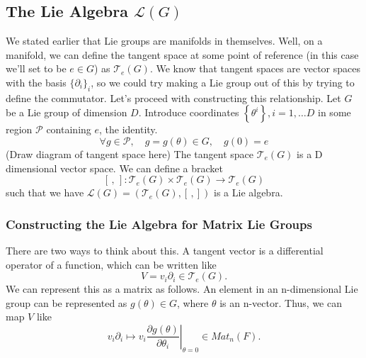 \subsection{The Lie Algebra $ \mathcal{ L } ( G ) $ } 

We stated earlier that Lie groups are manifolds in themselves. Well, on a manifold, we can define the tangent space at some point of reference (in this case we'll set to be $e \in G$) as $\mathcal{T}_{e}(G)$. We know that tangent spaces are vector spaces with the basis $\{ \partial_i\}_i $, so we could try making a Lie group out of this by trying to define the commutator. Let's 
proceed with constructing this relationship. 
Let $ G $ be a Lie group of dimension $ D $. Introduce 
coordinates $ \left\{  \theta ^{ i } \right\} , i  = 1, \dots D $ 
in some region $ \mathcal{ P } $ containing $ e $, the identity. 
\[
	\forall g \in \mathcal{ P }, \quad  g = g (\theta ) \in G, \quad g ( 0 ) =e  
\]  (Draw diagram of tangent space here) 
The tangent space $ \mathcal{ T }_{ e } ( G )  $ is a
D dimensional vector space. We can define a bracket 
\[
	[  \, , \, ] : \mathcal{ T }_e ( G) \times \mathcal{ T }_e ( G ) \to  \mathcal{ T }_ e ( G ) 
\] such that we have $ \mathcal{ L } ( G ) = ( \mathcal{ T}_e (  G ), [ \, , ] ) $
is a Lie algebra. 

\subsubsection{Constructing the Lie Algebra for Matrix Lie Groups} 
There are two ways to think about this. A tangent vector is a differential operator of a function, which can be written like 
\[ 
	V = v_i \partial_i \in \mathcal{T}_e(G). 
\] 
We can represent this as a matrix as follows. An element in an n-dimensional Lie group can be represented as $g(\theta) \in G$, where $\theta$ is an n-vector. Thus, we can map $V$ like 
\[
 	v_i \partial_i \mapsto \left. v_i \frac{\partial g(\theta)}{\partial \theta_i} \right\vert_{\theta = 0} \in Mat_n(F). 
\]

